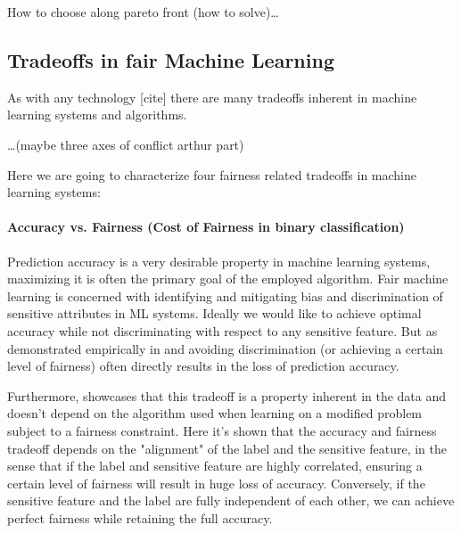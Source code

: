 	How to choose along pareto front (how to solve)\dots


	\subsection{Tradeoffs in fair Machine Learning}
	As with any technology [cite] there are many tradeoffs inherent in machine learning systems and algorithms.

	\dots (maybe three axes of conflict arthur part)

	Here we are going to characterize four fairness related tradeoffs in machine learning systems:
	
	\paragraph{Accuracy vs. Fairness (Cost of Fairness in binary classification)}
	Prediction accuracy is a very desirable property in machine learning systems, maximizing it is often the primary goal of the employed algorithm.
	Fair machine learning is concerned with identifying and mitigating bias and discrimination of sensitive attributes in ML systems.
	Ideally we would like to achieve optimal accuracy while not discriminating with respect to any sensitive feature.
	But as demonstrated empirically in \eg \cite{kamiran2010discrimination} and \cite{zliobaite2015relation} avoiding discrimination (or achieving a certain level of fairness) often directly results in the loss of prediction accuracy.

	Furthermore, \cite{menon2018cost} showcases that this tradeoff is a property inherent in the data and doesn't depend on the algorithm used when learning on a modified problem subject to a fairness constraint.
	Here it's shown that the accuracy and fairness tradeoff depends on the "alignment" of the label and the sensitive feature, in the sense that if the label and sensitive feature are highly correlated, ensuring a certain level of fairness will result in huge loss of accuracy.
	Conversely, if the sensitive feature and the label are fully independent of each other, we can achieve perfect fairness while retaining the full accuracy.

